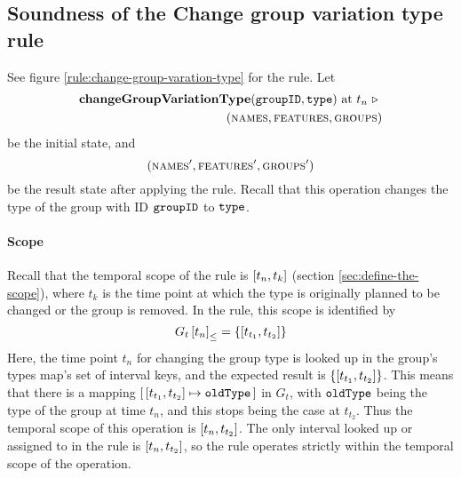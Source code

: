 

\subsection{Soundness of the Change group variation type rule} 
\label{sub:soundness-of-the-change-group-variation-type-rule}

See figure \vref{rule:change-group-varation-type} for the  rule. Let 
\begin{equation*}
   \begin{split}
      \textbf{changeGroupVariationType}(\texttt{groupID}, \texttt{type}) \text{ at } t_n \ \triangleright \  \\
      (\textsc{names}, \textsc{features}, \textsc{groups}{})
   \end{split}
\end{equation*}
be the initial state, and
\[
   (\textsc{names}', \textsc{features}', \textsc{groups}{}')
\]
be the result state after applying the  rule. Recall that this operation changes the type of the group with ID $\texttt{groupID}$ to $\texttt{type}$.

\paragraph{Scope}
Recall that the temporal scope of the  rule is $\interval{t_n}{t_k}$ (section \vref{sec:define-the-scope}), where $t_k$ is the time point at which the type is originally planned to be changed or the group is removed. In the rule, this scope is identified by 
   \[
      \containing{G_t}{t_n} = \set{\interval{t_{t_1}}{t_{t_2}}}
   \]
   Here, the time point $t_n$ for changing the group type is looked up in the group's types map's set of interval keys, and the expected result is $\set{\interval{t_{t_1}}{t_{t_2}}}$. This means that there is a mapping $\intervalmapping{t_{t_1}}{t_{t_2}}{\var{oldType}}$ in $G_t$, with $\texttt{oldType}$ being the type of the group at time $t_n$, and this stops being the case at $t_{t_2}$. Thus the temporal scope of this operation is $\interval{t_n}{t_{t_2}}$. The only interval looked up or assigned to in the rule is $\interval{t_n}{t_{t_2}}$, so the rule operates strictly within the temporal scope of the operation.

